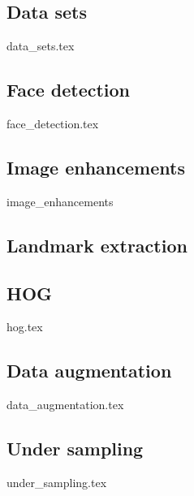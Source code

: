 \subsection{Data sets}
{data_sets.tex}

\subsection{Face detection}
{face_detection.tex}

\subsection{Image enhancements}
{image_enhancements}


\subsection{Landmark extraction}


\subsection{HOG}
{hog.tex}

\subsection{Data augmentation}
{data_augmentation.tex}

\subsection{Under sampling}
{under_sampling.tex}